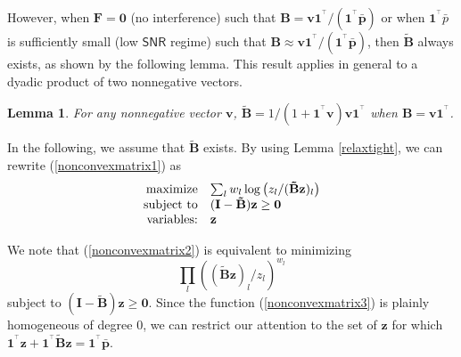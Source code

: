 \documentclass[10pt,twocolumn]{IEEEtran}
\newcommand{\0}{\mathbf{0}}
\newcommand{\1}{\mathbf{1}}
\newcommand{\trans}{^\top}
\newtheorem{lemma}{Lemma}
\begin{document}
However, when $\mathbf{F}=\mathbf{0}$ (no interference) such that $\mathbf{B}=\mathbf{v}\mathbf{1}^{\trans}/(\mathbf{1}^{\trans}\mathbf{\bar{p}})$ or when $\mathbf{1}^{\trans}\bar{p}$ is sufficiently small (low $\mathsf{SNR}$ regime) such that $\mathbf{B} \approx \mathbf{v}\mathbf{1}^{\trans}/(\mathbf{1}^{\trans}\mathbf{\bar{p}})$, then $\mathbf{\tilde{B}}$ always exists, as shown by the following lemma. This result applies in general to a dyadic product of two nonnegative vectors.
\begin{lemma}
\label{bhastildeb}
For any nonnegative vector $\mathbf{v}$, $\mathbf{\tilde{B}}=1/(1+\mathbf{1}^{\trans} \mathbf{v})\mathbf{v}\mathbf{1}^{\trans}$ when $\mathbf{B}=\mathbf{v}\mathbf{1}^{\trans}$.
\end{lemma}

In the following, we assume that $\mathbf{\tilde{B}}$ exists. By using Lemma \ref{relaxtight}, we can rewrite (\ref{nonconvexmatrix1}) as
\begin{equation}
\label{nonconvexmatrix2}
\begin{array}
[c]{rl}
\mbox{maximize} & \sum_l w_l \log\left(z_l/(\mathbf{\tilde{B}}\mathbf{z})_l\right) \\
\mbox{subject to} & (\mathbf{I} - \mathbf{\tilde{B}}) \mathbf{z} \ge \mathbf{0} \\
\mbox{variables:} & \mathbf{z}
\end{array}
\end{equation}

We note that (\ref{nonconvexmatrix2}) is equivalent to minimizing
\begin{equation}
\label{nonconvexmatrix3}
\prod_l \left((\mathbf{\tilde{B}}\mathbf{z})_l/z_l\right)^{w_l}
\end{equation}
subject to $(\mathbf{I} - \mathbf{\tilde{B}}) \mathbf{z} \ge \mathbf{0}$. Since the function (\ref{nonconvexmatrix3}) is plainly homogeneous of degree $0$, we can restrict our attention to the set of $\mathbf{z}$ for which $\mathbf{1}^{\trans}\mathbf{z}+\mathbf{1}^{\trans}\mathbf{\tilde{B}}\mathbf{z} = \mathbf{1}^{\trans}\mathbf{\bar{p}}$.
\end{document}

